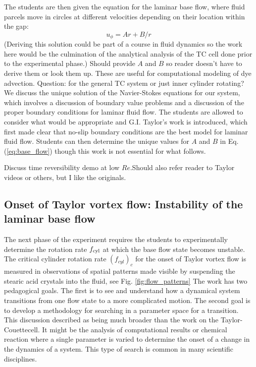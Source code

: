 \documentclass[%
reprint,
 amsmath,amssymb,
 aps,
prb,
floatfix,
longbibliography,
notitlepage
]{revtex4-1}
\newcommand{\BE}{\begin{equation}}
\newcommand{\EE}{\end{equation}}
\newcommand{\DB}[1]{{\color{red}#1}} %
\newcommand{\BR}[1]{{\color{blue}#1}} %
\newcommand{\TC}{Taylor-Couette}
\newcommand{\vel}{\ensuremath{u}} %
\newcommand{\ReN}{\ensuremath{Re}} %
\begin{document}
The students are then given the equation for the laminar base flow, where fluid parcels move in circles at different velocities depending on their location within the gap: 
\BE
\vel_\phi = Ar + B/r
\label{eq:base_flow}
\EE
(Deriving this solution could be part of a course in fluid dynamics so the work here would be the culmination of the analytical analysis of the TC cell done prior to the experimental phase.) \DB{Should provide $A$ and $B$ so reader doesn't have to derive them or look them up. These are useful for computational modeling of dye advection.} \BR{Question: for the general TC system or just inner cylinder rotating?} We discuss the unique solution of the Navier-Stokes equations for our system, which involves a discussion of boundary value problems and a discussion of the proper boundary conditions for laminar fluid flow. The students are allowed to consider what would be appropriate and G.I. Taylor's work is introduced, which first made clear that no-slip boundary conditions are the best model for laminar fluid flow. Students can then determine the unique values for $A$ and $B$ in Eq.(\ref{eq:base_flow}) though this work is not essential for what follows. 

\DB{Discuss time reversibility demo at low \ReN.}\BR{Should also refer reader to Taylor videos or others, but I like the originals.}

\subsection{Onset of Taylor vortex flow: Instability of the laminar base flow}

The next phase of the experiment requires the students to experimentally determine the rotation rate $f_{\rm cyl}$ at which the base flow state becomes unstable. The critical cylinder rotation rate $(f_{cyl})_c$ for the onset of Taylor vortex flow is measured in observations of spatial patterns made visible by suspending the stearic acid crystals into the fluid, see Fig. \ref{fig:flow_patterns}  The work has two pedagogical goals. The first is to see and understand how a dynamical system transitions from one flow state to a more complicated motion. The second goal is to develop a methodology for searching in a parameter space for a transition. This discussion described as being much broader than the work on the \TC cell. It might be the analysis of computational results or chemical reaction where a single parameter is varied to determine the onset of a change in the dynamics of a system. This type of search is common in many scientific disciplines. 
\end{document}

